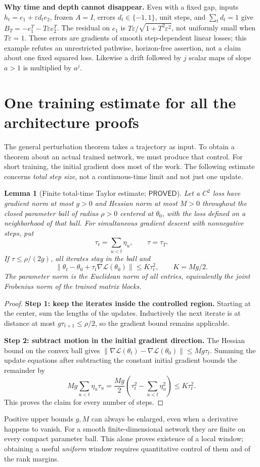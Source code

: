 \documentclass[12pt,a4paper]{article}
\theoremstyle{readable}
\newtheorem{lemma}[theorem]{Lemma}
\theoremstyle{definition}\newtheorem{example}[theorem]{Example}
\newcommand{\norm}[1]{\left\|#1\right\|}
\newcommand{\PP}{\mathsf{PROVED}}\newcommand{\FF}{\mathsf{FALSE}}
\begin{document}
\textbf{Why time and depth cannot disappear.} Even with a fixed gap, inputs \(h_t=e_1+\varepsilon d_te_2\), frozen \(A=I\), errors \(d_t\in\{-1,1\}\), unit steps, and \(\sum_td_t=1\) give \(B_T=-e_1^T-T\varepsilon e_2^T\). The residual on \(e_1\) is \(T\varepsilon/\sqrt{1+T^2\varepsilon^2}\), not uniformly small when \(T\varepsilon=1\). These errors are gradients of smooth step-dependent linear losses; this example refutes an unrestricted pathwise, horizon-free assertion, not a claim about one fixed squared loss. Likewise a drift followed by \(j\) scalar maps of slope \(a>1\) is multiplied by \(a^j\).

\section{One training estimate for all the architecture proofs}
\label{sec:time}

The general perturbation theorem takes a trajectory as input. To obtain a theorem about an actual trained network, we must produce that control. For short training, the initial gradient does most of the work. The following estimate concerns \emph{total step size}, not a continuous-time limit and not just one update.

\begin{lemma}[Finite total-time Taylor estimate; \(\PP\)]\label{lem:time}
Let a \(C^2\) loss have gradient norm at most \(g>0\) and Hessian norm at most \(M>0\) throughout the closed parameter ball of radius \(\rho>0\) centered at \(\theta_0\), with the loss defined on a neighborhood of that ball. For simultaneous gradient descent with nonnegative steps, put
\[
\tau_t=\sum_{u<t}\eta_u,\qquad \tau=\tau_T.
\]
If \(\tau\le\rho/(2g)\), all iterates stay in the ball and
\begin{equation}\label{eq:time}
\norm{\theta_t-\theta_0+\tau_t\nabla\mathcal L(\theta_0)}
\le K\tau_t^2,\qquad K=Mg/2.
\end{equation}
The parameter norm is the Euclidean norm of all entries, equivalently the joint Frobenius norm of the trained matrix blocks.
\end{lemma}
\begin{proof}
\textbf{Step 1: keep the iterates inside the controlled region.} Starting at the center, sum the lengths of the updates. Inductively the next iterate is at distance at most \(g\tau_{t+1}\le\rho/2\), so the gradient bound remains applicable.

\textbf{Step 2: subtract motion in the initial gradient direction.} The Hessian bound on the convex ball gives
\(\norm{\nabla\mathcal L(\theta_t)-\nabla\mathcal L(\theta_0)}\le Mg\tau_t\).
Summing the update equations after subtracting the constant initial gradient bounds the remainder by
\[
Mg\sum_{u<t}\eta_u\tau_u
=\frac{Mg}{2}\left(\tau_t^2-\sum_{u<t}\eta_u^2\right)
\le K\tau_t^2.
\]
This proves the claim for every number of steps.
\end{proof}
Positive upper bounds \(g,M\) can always be enlarged, even when a derivative happens to vanish. For a smooth finite-dimensional network they are finite on every compact parameter ball. This alone proves existence of a local window; obtaining a useful \emph{uniform} window requires quantitative control of them and of the rank margins.
\end{document}

